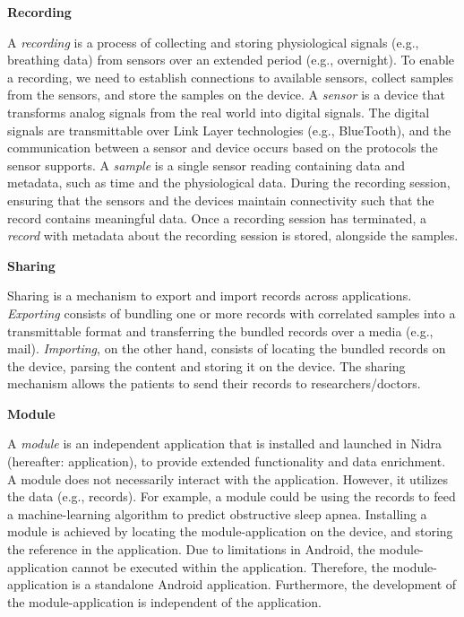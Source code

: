 
\noindent\textbf{Recording}

\noindent A \textit{recording} is a process of collecting and storing physiological signals (e.g., breathing data) from sensors over an extended period (e.g., overnight). To enable a recording, we need to establish connections to available sensors, collect samples from the sensors, and store the samples on the device. A \textit{sensor} is a device that transforms analog signals from the real world into digital signals. The digital signals are transmittable over Link Layer technologies (e.g., BlueTooth), and the communication between a sensor and device occurs based on the protocols the sensor supports. A \textit{sample} is a single sensor reading containing data and metadata, such as time and the physiological data. During the recording session, ensuring that the sensors and the devices maintain connectivity such that the record contains meaningful data.  Once a recording session has terminated, a \textit{record} with metadata about the recording session is stored, alongside the samples.    

\noindent \textbf{Sharing}

\noindent Sharing is a mechanism to export and import records across applications. \textit{Exporting} consists of bundling one or more records with correlated samples into a transmittable format and transferring the bundled records over a media (e.g., mail). \textit{Importing}, on the other hand, consists of locating the bundled records on the device, parsing the content and storing it on the device. The sharing mechanism allows the patients to send their records to researchers/doctors.

\noindent \textbf{Module}

\noindent A \textit{module} is an independent application that is installed and launched in Nidra (hereafter: application), to provide extended functionality and data enrichment. A module does not necessarily interact with the application. However, it utilizes the data (e.g., records). For example, a module could be using the records to feed a machine-learning algorithm to predict obstructive sleep apnea. Installing a module is achieved by locating the module-application on the device, and storing the reference in the application. Due to limitations in Android, the module-application cannot be executed within the application. Therefore, the module-application is a standalone Android application. Furthermore, the development of the module-application is independent of the application. 

